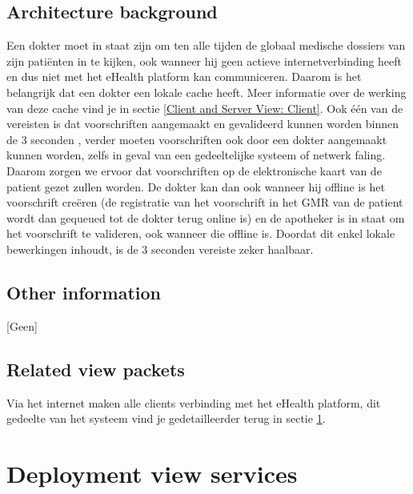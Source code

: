 \documentclass[a4paper,10pt]{article}
\begin{document}
\subsection{Architecture background}
Een dokter moet in staat zijn om ten alle tijden de globaal medische dossiers van zijn patiënten in te kijken, ook wanneer hij geen actieve internetverbinding heeft en dus niet met het eHealth platform kan communiceren. Daarom is het belangrijk dat een dokter een lokale cache heeft. Meer informatie over de werking van deze cache vind je in sectie \ref{Client and Server View: Client}.
Ook één van de vereisten is dat voorschriften aangemaakt en gevalideerd kunnen worden binnen de 3 seconden , verder moeten voorschriften ook door een dokter aangemaakt kunnen worden, zelfs in geval van een gedeeltelijke systeem of netwerk faling. Daarom zorgen we ervoor dat voorschriften op de elektronische kaart van de patient gezet zullen worden. De dokter kan dan ook wanneer hij offline is het voorschrift creëren (de registratie van het voorschrift in het GMR van de patient wordt dan gequeued tot de dokter terug online is) en de apotheker is in staat om het voorschrift te valideren, ook wanneer die offline is. Doordat dit enkel lokale bewerkingen inhoudt, is de 3 seconden vereiste zeker haalbaar.

\subsection{Other information}
[Geen]

\subsection{Related view packets}
Via het internet maken alle clients verbinding met het eHealth platform, dit gedeelte van het systeem vind je gedetailleerder terug in sectie \ref{sec:deployment_services}.

\clearpage
\section{Deployment view services}
\label{sec:deployment_services}
\end{document}

